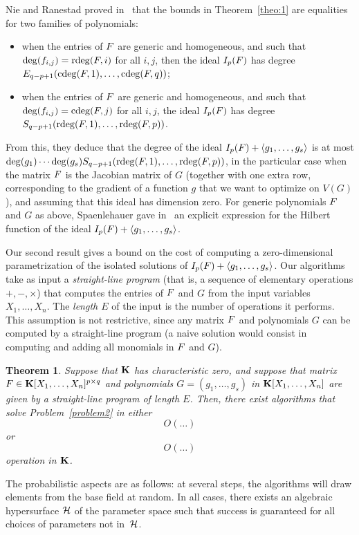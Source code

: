 \documentclass[12pt]{article}
\newtheorem{theorem}[definition]{Theorem}
\begin{document}
Nie and Ranestad proved in~\cite{NieRan09} that the bounds in
Theorem~\ref{theo:1} are equalities for two families of polynomials:
\begin{itemize}
\item when the entries of ${F}$ are generic and homogeneous, and
  such that $\deg(f_{i,j}) = \mathrm{rdeg}({F},i)$ for all $i,j$, then the
  ideal $I_p({F})$ has degree $E_{q-p+1}(\mathrm{cdeg}({F},1), \ldots, \mathrm{cdeg}({F},q))$;
\item when the entries of ${F}$ are  generic and homogeneous, and
  such that $\deg(f_{i,j}) = \mathrm{cdeg}({F},j)$ for all $i,j$, the ideal
  $I_p({F})$ has degree $S_{q-p+1}(\mathrm{rdeg}({F},1), \ldots, \mathrm{rdeg}({F},p))$.
\end{itemize}
From this, they deduce that the degree of the ideal $I_p({F}) +
\langle g_1,\dots,g_s \rangle$ is at most \sloppy $\deg(g_1) \cdots
\deg(g_s) S_{q-p+1}(\mathrm{rdeg}({F},1), \ldots, \mathrm{rdeg}({F},p))$, in the
particular case when the matrix ${F}$ is the Jacobian matrix of $G$
(together with one extra row, corresponding to the gradient of a
function $g$ that we want to optimize on $V(G)$), and assuming that
this ideal has dimension zero. For generic polynomials
${F}$ and $G$ as above, Spaenlehauer gave in~\cite{Spa14} an explicit
expression for the Hilbert function of the ideal $I_p({F}) + \langle
g_1,\dots,g_s \rangle$.

\smallskip

Our second result gives a bound on the cost of computing a
zero-dimensional parametrization of the isolated solutions of
$I_p({F}) + \langle g_1,\dots,g_s \rangle$. Our algorithms take as
input a \emph{straight-line program} (that is, a sequence of
elementary operations $+, -, \times$) that computes the entries of
${F}$ and $G$ from the input variables $X_1,\dots,X_n$. The
\emph{length $E$} of the input is the number of operations it
performs. This assumption is not restrictive, since any matrix ${F}$
and polynomials $G$ can be computed by a straight-line program
(a naive solution would consist in computing and adding all monomials
in ${F}$ and $G$).

\begin{theorem}
  Suppose that $\mathbf{K}$ has characteristic zero, and suppose that matrix
  ${F} \in \mathbf{K}[X_1,\dots,X_n]^{p \times q}$ and polynomials
  $G=(g_1,\dots,g_s)$ in $\mathbf{K}[X_1,\dots,X_n]$ are given by a
  straight-line program of length $E$. Then, there exist 
   algorithms that solve Problem~\ref{problem2} in either
   $$O( \dots )$$
or 
   $$O( \dots )$$
  operation in $\mathbf{K}$.
\end{theorem}
The probabilistic aspects are as follows: at several steps, the
algorithms will draw elements from the base field at random. In all
cases, there exists an algebraic hypersurface $\cal H$ of the parameter
space such that success is guaranteed for all choices of parameters not
in~$\cal H$.
\end{document}
